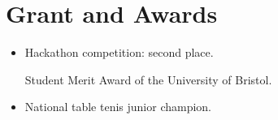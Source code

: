 \section{Grant and Awards}
\begin{mySectionContents}
\begin{itemize}
    \setlength\itemsep{2em} %
    \item {}
    \begin{itemize}
         Hackathon competition: second place.

         Student Merit Award of the University of Bristol.

    \end{itemize}
    \item {}
    \begin{itemize}
         National table tenis junior champion.
    \end{itemize}
\end{itemize}

\end{mySectionContents}